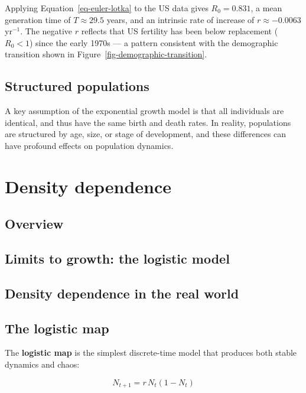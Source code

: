 \documentclass[
  letterpaper,
]{scrbook}
\begin{document}
Applying Equation~\ref{eq-euler-lotka} to the US data gives
\(R_0 = 0.831\), a mean generation time of \(T \approx 29.5\) years, and
an intrinsic rate of increase of \(r \approx -0.0063\) yr\(^{-1}\). The
negative \(r\) reflects that US fertility has been below replacement
(\(R_0 < 1\)) since the early 1970s --- a pattern consistent with the
demographic transition shown in Figure~\ref{fig-demographic-transition}.

\section{Structured populations}\label{structured-populations}

A key assumption of the exponential growth model is that all individuals
are identical, and thus have the same birth and death rates. In reality,
populations are structured by age, size, or stage of development, and
these differences can have profound effects on population dynamics.


\chapter{Density dependence}\label{density-dependence}

\section{Overview}\label{sec-topic2-overview}

\section{Limits to growth: the logistic model}\label{sec-logistic}

\section{Density dependence in the real
world}\label{sec-density-dependence}

\section{The logistic map}\label{the-logistic-map}

The \textbf{logistic map} is the simplest discrete-time model that
produces both stable dynamics and chaos:

\[
N_{t+1} = r \, N_t (1 - N_t)
\]
\end{document}
